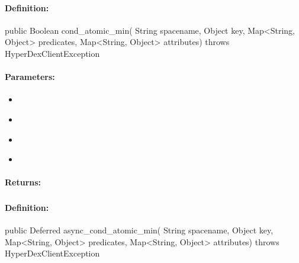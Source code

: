 \paragraph{Definition:}
\begin{javacode}
public Boolean cond_atomic_min(
        String spacename,
        Object key,
        Map<String, Object> predicates,
        Map<String, Object> attributes) throws HyperDexClientException
\end{javacode}

\paragraph{Parameters:}
\begin{itemize}[noitemsep]
\item {}\\

\item {}\\

\item {}\\

\item {}\\

\end{itemize}

\paragraph{Returns:}


\pagebreak
\subsubsection{}
\label{api:java:async_cond_atomic_min}


\paragraph{Definition:}
\begin{javacode}
public Deferred async_cond_atomic_min(
        String spacename,
        Object key,
        Map<String, Object> predicates,
        Map<String, Object> attributes) throws HyperDexClientException
\end{javacode}

